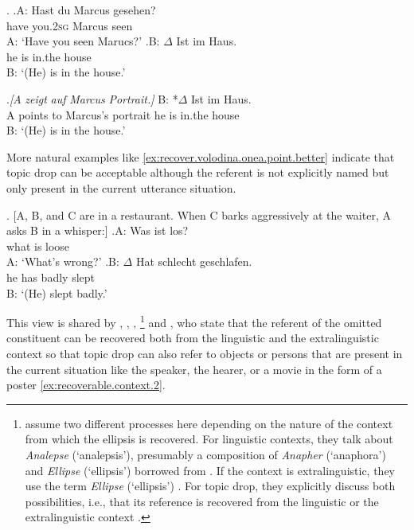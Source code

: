 \ex.\label{ex:recover.volodina.onea}
\ag.A: Hast du Marcus gesehen? \\
{} have you.\textsc{2sg} Marcus seen\\
A: `Have you seen Marucs?'
\bg.B: $\Delta$ Ist im Haus.\\
{} he is in.the house\\
B: `(He) is in the house.'

\exg.\label{ex:recover.volodina.onea.point}\emph{[}\emph{A} \emph{zeigt} \emph{auf} \emph{Marcus} \emph{Portrait.}\emph{]} B: *$\Delta$ Ist im Haus.\\
\phantom{(}A points to Marcus's portrait {} he is in.the house\\
[\emph{A points to Marcus's portrait.}] B: `(He) is in the house.' \citep[217, their judgments]{volodina.onea2012}

More natural examples like \ref{ex:recover.volodina.onea.point.better} indicate that topic drop can be acceptable although the referent is not explicitly named but only present in the current utterance situation.

\ex.\label{ex:recover.volodina.onea.point.better} [A, B, and C are in a restaurant. When C barks aggressively at the waiter, A asks B in a whisper:]
\ag.A: Was ist los?\\
{} what is loose\\
A: `What's wrong?'
\bg.B: $\Delta$ Hat schlecht geschlafen.\\
{} he has badly slept\\
B: `(He) slept badly.'

This view is shared by \citet{fries1988}, \citet{cardinaletti1990}, \citet{zifonun.etal1997},%
\footnote{\citet{zifonun.etal1997} assume two different processes here depending on the nature of the context from which the ellipsis is recovered.
For linguistic contexts, they talk about \textit{Analepse} (`analepsis'), presumably a composition of \textit{Anapher} (`anaphora') and \textit{Ellipse} (`ellipsis') borrowed from \citet{blatz1896} \citep[569--571]{zifonun.etal1997}.
If the context is extralinguistic, they use the term \textit{Ellipse} (`ellipsis') \citep[413]{zifonun.etal1997}.
For topic drop, they explicitly discuss both possibilities, i.e., that its reference is recovered from the linguistic or the extralinguistic context \citep[636]{zifonun.etal1997}.}
%
and \citet{volodina2011}, who state that the referent of the omitted constituent can be recovered both from the linguistic and the extralinguistic context so that topic drop can also refer to objects or persons that are present in the current situation like the speaker, the hearer, or a movie in the form of a poster \ref{ex:recoverable.context.2}.

